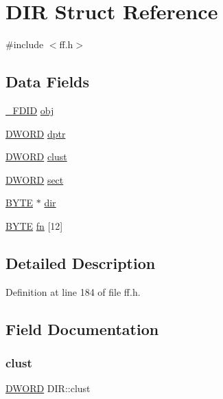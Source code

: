 \hypertarget{structDIR}{}\section{D\+IR Struct Reference}
\label{structDIR}


{\ttfamily \#include $<$ff.\+h$>$}

\subsection*{Data Fields}
\begin{DoxyCompactItemize}
\item 
\hyperlink{struct__FDID}{\+\_\+\+F\+D\+ID} \hyperlink{structDIR_a5a4848c51616bf4ad90518c211ca3bb3}{obj}
\item 
\hyperlink{integer_8h_ad342ac907eb044443153a22f964bf0af}{D\+W\+O\+RD} \hyperlink{structDIR_a0330e9554e1f38795debe4495156873e}{dptr}
\item 
\hyperlink{integer_8h_ad342ac907eb044443153a22f964bf0af}{D\+W\+O\+RD} \hyperlink{structDIR_acfbb8ba2d6e73b6f999ceffd1857c190}{clust}
\item 
\hyperlink{integer_8h_ad342ac907eb044443153a22f964bf0af}{D\+W\+O\+RD} \hyperlink{structDIR_ad01fcc812ed0dad11a593574336adc9e}{sect}
\item 
\hyperlink{lz4_8c_a4ae1dab0fb4b072a66584546209e7d58}{B\+Y\+TE} $\ast$ \hyperlink{structDIR_a6c2a8c0cf2d55ae99775e93a16593449}{dir}
\item 
\hyperlink{lz4_8c_a4ae1dab0fb4b072a66584546209e7d58}{B\+Y\+TE} \hyperlink{structDIR_ad90d974c0e7640307598c586bf141b32}{fn} \mbox{[}12\mbox{]}
\end{DoxyCompactItemize}


\subsection{Detailed Description}


Definition at line 184 of file ff.\+h.



\subsection{Field Documentation}
\mbox{\label{structDIR_acfbb8ba2d6e73b6f999ceffd1857c190}} 
\subsubsection{\texorpdfstring{clust}{clust}}
{\footnotesize\ttfamily \hyperlink{integer_8h_ad342ac907eb044443153a22f964bf0af}{D\+W\+O\+RD} D\+I\+R\+::clust}



